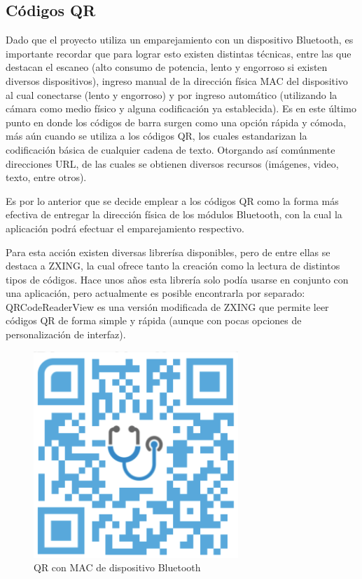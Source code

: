 \newpage

\subsection{Códigos QR}

Dado que el proyecto utiliza un emparejamiento con un dispositivo Bluetooth, es importante recordar que para lograr esto existen distintas técnicas, entre las que destacan el escaneo (alto consumo de potencia, lento y engorroso si existen diversos dispositivos), ingreso manual de la dirección física MAC del dispositivo al cual conectarse (lento y engorroso) y por ingreso automático (utilizando la cámara como medio físico y alguna codificación ya establecida). Es en este último punto en donde los códigos de barra surgen como una opción rápida y cómoda, más aún cuando se utiliza a los códigos QR, los cuales estandarizan la codificación básica de cualquier cadena de texto. Otorgando así comúnmente direcciones URL, de las cuales se obtienen diversos recursos (imágenes, video, texto, entre otros).

Es por lo anterior que se decide emplear a los códigos QR como la forma más efectiva de entregar la dirección física de los módulos Bluetooth, con la cual la aplicación podrá efectuar el emparejamiento respectivo.

Para esta acción existen diversas librerísa disponibles, pero de entre ellas se destaca a ZXING, la cual ofrece tanto la creación como la lectura de distintos tipos de códigos. Hace unos años esta librería solo podía usarse en conjunto con una aplicación, pero actualmente es posible encontrarla por separado: QRCodeReaderView es una versión modificada de ZXING que permite leer códigos QR de forma simple y rápida (aunque con pocas opciones de personalización de interfaz).

\begin{figure}[H]
	\centering
	\includegraphics[scale=0.6]{figuras/proto1/qr.png}
	\caption{QR con MAC de dispositivo Bluetooth}
	\label{qr}
\end{figure}


